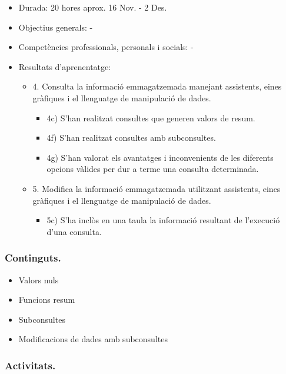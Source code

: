 \documentclass[catalan, a4paper, 12pt, titlepage]{article}
\begin{document}
  \begin{itemize}
	\item Durada: 20 hores aprox. 16 Nov. - 2 Des.
	\item Objectius generals: -
	\item Competències professionals, personals i socials: -
	\item Resultats d'aprenentatge: 
		\begin{itemize}
			\item 4. Consulta la informació emmagatzemada manejant assistents, eines gràfiques i el llenguatge de manipulació de dades.
				\begin{itemize}
					\item 4c) S'han realitzat consultes que generen valors de resum.
					\item 4f) S'han realitzat consultes amb subconsultes.
					\item 4g) S'han valorat els avantatges i inconvenients de les diferents opcions vàlides per dur a terme una consulta determinada.
				\end{itemize}
			\item 5. Modifica la informació emmagatzemada utilitzant assistents, eines gràfiques i el llenguatge de manipulació de dades.
				\begin{itemize}
					\item 5c) S'ha inclòs en una taula la informació resultant de l'execució d'una consulta.
				\end{itemize}
		\end{itemize}
  \end{itemize}

  \subsubsection{Continguts.}
  \begin{itemize}
	  \item Valors nuls
	  \item Funcions resum
	  \item Subconsultes
	  \item Modificacions de dades amb subconsultes
  \end{itemize}
  
  \subsubsection{Activitats.}
\end{document}

